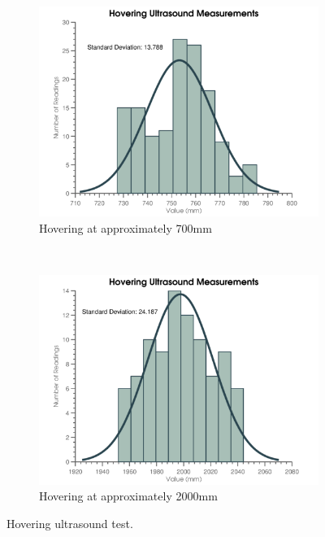		\begin{figure}[ht]
		        \centering
		        \begin{subfigure}[b]{0.45\textwidth}
		                \centering
		                \includegraphics[width=\textwidth]{../images/ultra_test1.png}
		                \caption{Hovering at approximately 700mm}\label{fig:ultra1}
		        \end{subfigure}%
		        ~
		        \begin{subfigure}[b]{0.45\textwidth}
		                \centering
		                \includegraphics[width=\textwidth]{../images/ultra_test2.png}
		                \caption{Hovering at approximately 2000mm}\label{fig:ultra2}
		        \end{subfigure}
		        \caption{Hovering ultrasound test.}
		\end{figure}

